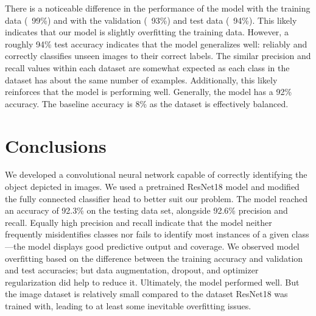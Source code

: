 \documentclass[10pt]{article}
\begin{document}
\indent There is a noticeable difference in the performance of the model with the training data (~99\%) and with the validation (~93\%) and test data (~94\%). This likely indicates that our model is slightly overfitting the training data. However, a roughly 94\% test accuracy indicates that the model generalizes well: reliably and correctly classifies unseen images to their correct labels. The similar precision and recall values within each dataset are somewhat expected as each class in the dataset has about the same number of examples. Additionally, this likely reinforces that the model is performing well. Generally, the model has a 92\% accuracy. The baseline accuracy is 8\% as the dataset is effectively balanced.






\section{Conclusions}

\indent We developed a convolutional neural network capable of correctly identifying the object depicted in images. We used a pretrained ResNet18 model and modified the fully connected classifier head to better suit our problem. The model reached an accuracy of 92.3\% on the testing data set, alongside 92.6\% precision and recall. Equally high precision and recall indicate that the model neither frequently misidentifies classes nor fails to identify most instances of a given class—the model displays good predictive output and coverage. We observed model overfitting based on the difference between the training accuracy and validation and test accuracies; but data augmentation, dropout, and optimizer regularization did help to reduce it. Ultimately, the model performed well. But the image dataset is relatively small compared to the dataset ResNet18 was trained with, leading to at least some inevitable overfitting issues.





\end{document}
